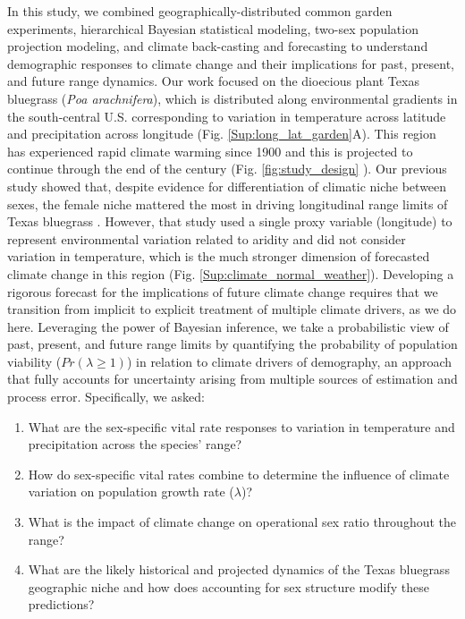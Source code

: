 \documentclass[12pt]{article}\usepackage[]{graphicx}\usepackage[dvipsnames]{xcolor}
\begin{document}
In this study, we combined geographically-distributed common garden experiments, hierarchical Bayesian statistical modeling, two-sex population projection modeling, and climate back-casting and forecasting to understand demographic responses to climate change and their implications for past, present, and future range dynamics. 
Our work focused on the dioecious plant Texas bluegrass (\textit{Poa arachnifera}), which is distributed along environmental gradients in the south-central U.S. corresponding to variation in temperature across latitude and precipitation across longitude (Fig. \ref{Sup:long_lat_garden}A). 
This region has experienced rapid climate warming since 1900 and this is projected to continue through the end of the century (Fig. \ref{fig:study_design} ). 
Our previous study showed that, despite evidence for differentiation of climatic niche between sexes, the female niche mattered the most in driving longitudinal range limits of Texas bluegrass \citep{miller2022two}. 
However, that study used a single proxy variable (longitude) to represent environmental variation related to aridity and did not consider variation in temperature, which is the much stronger dimension of forecasted climate change in this region (Fig. \ref{Sup:climate_normal_weather}). 
Developing a rigorous forecast for the implications of future climate change requires that we transition from implicit to explicit treatment of multiple climate drivers, as we do here.
Leveraging the power of Bayesian inference, we take a probabilistic view of past, present, and future range limits by quantifying the probability of population viability ($Pr(\lambda\ge1)$) in relation to climate drivers of demography, an approach that fully accounts for uncertainty arising from multiple sources of estimation and process error. %
Specifically, we asked: 
\begin{enumerate}
	\item What are the sex-specific vital rate responses to variation in temperature and precipitation across the species' range?
	\item How do sex-specific vital rates combine to determine the influence of climate variation on population growth rate ($\lambda$)?
	\item What is the impact of climate change on operational sex ratio throughout the range?
	\item What are the likely historical and projected dynamics of the Texas bluegrass geographic niche and how does accounting for sex structure modify these predictions?
\end{enumerate}
\end{document}
